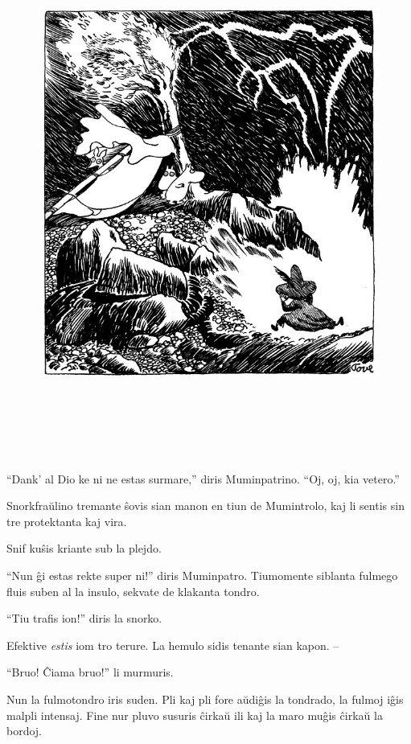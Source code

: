 \begin{figure}[htbp]
\centering
\includegraphics[width=450pt,height=492pt]{_15.jpg}
\caption{}
\label{_15}
\end{figure}

``Dank' al Dio ke ni ne estas surmare,'' diris Muminpatrino. ``Oj, oj, kia vetero.''

Snorkfraŭlino tremante ŝovis sian manon en tiun de Mumintrolo, kaj li sentis sin tre protektanta kaj vira.

Snif kuŝis kriante sub la plejdo.

``Nun ĝi estas rekte super ni!'' diris Muminpatro. Tiumomente siblanta fulmego fluis suben al la insulo, sekvate de klakanta tondro.

``Tiu trafis ion!'' diris la snorko.

Efektive \emph{estis} iom tro terure. La hemulo sidis tenante sian kapon. --

``Bruo! Ĉiama bruo!'' li murmuris.

Nun la fulmotondro iris suden. Pli kaj pli fore aŭdiĝis la tondrado, la fulmoj iĝis malpli intensaj. Fine nur pluvo susuris ĉirkaŭ ili kaj la maro muĝis ĉirkaŭ la bordoj.

